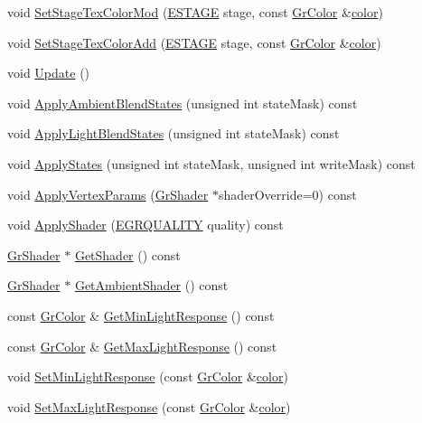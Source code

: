 \begin{CompactItemize}
\item 
void \hyperlink{class_gr_material_pass_92554ebb8bec4354879389bd7d225d10}{SetStageTexColorMod} (\hyperlink{_gr_config_8h_6df36e6af6bdeed00ff250f968160688}{ESTAGE} stage, const \hyperlink{class_gr_color}{GrColor} \&\hyperlink{glext_8h_3ea846f998d64f079b86052b6c4193a8}{color})
\item 
void \hyperlink{class_gr_material_pass_ce347100ba76c2cbaadee8ee02baa4db}{SetStageTexColorAdd} (\hyperlink{_gr_config_8h_6df36e6af6bdeed00ff250f968160688}{ESTAGE} stage, const \hyperlink{class_gr_color}{GrColor} \&\hyperlink{glext_8h_3ea846f998d64f079b86052b6c4193a8}{color})
\item 
void \hyperlink{class_gr_material_pass_461a5f3b7e2ffc51491914ed6bd9654c}{Update} ()
\item 
void \hyperlink{class_gr_material_pass_645501d055a4d4cffb0482a8f91448be}{ApplyAmbientBlendStates} (unsigned int stateMask) const 
\item 
void \hyperlink{class_gr_material_pass_dfdd256fcb0d7bfac731b6db4d9eb575}{ApplyLightBlendStates} (unsigned int stateMask) const 
\item 
void \hyperlink{class_gr_material_pass_272b822ee696efb7e967a9565cd79a97}{ApplyStates} (unsigned int stateMask, unsigned int writeMask) const 
\item 
void \hyperlink{class_gr_material_pass_7ef513dc8a50374348a402c10a3f3cd0}{ApplyVertexParams} (\hyperlink{class_gr_shader}{GrShader} $\ast$shaderOverride=0) const 
\item 
void \hyperlink{class_gr_material_pass_e7fce70c080ca855afb28e2cd0e729bc}{ApplyShader} (\hyperlink{enums_8h_697c1ee1354746841860d5bf9f81c033}{EGRQUALITY} quality) const 
\item 
\hyperlink{class_gr_shader}{GrShader} $\ast$ \hyperlink{class_gr_material_pass_c03a1be09b50c814be01d535c64c4da3}{GetShader} () const 
\item 
\hyperlink{class_gr_shader}{GrShader} $\ast$ \hyperlink{class_gr_material_pass_4581e9b370422f95a8a7e9c8556d0e78}{GetAmbientShader} () const 
\item 
const \hyperlink{class_gr_color}{GrColor} \& \hyperlink{class_gr_material_pass_9609353bb1089baeba6a0a176501cf9f}{GetMinLightResponse} () const 
\item 
const \hyperlink{class_gr_color}{GrColor} \& \hyperlink{class_gr_material_pass_404104b92d23577c62da193eaeacc6cf}{GetMaxLightResponse} () const 
\item 
void \hyperlink{class_gr_material_pass_ddf56d1ef2931a1cded781325ddd8738}{SetMinLightResponse} (const \hyperlink{class_gr_color}{GrColor} \&\hyperlink{glext_8h_3ea846f998d64f079b86052b6c4193a8}{color})
\item 
void \hyperlink{class_gr_material_pass_f66502995683becd9fd606d48da3a384}{SetMaxLightResponse} (const \hyperlink{class_gr_color}{GrColor} \&\hyperlink{glext_8h_3ea846f998d64f079b86052b6c4193a8}{color})
\end{CompactItemize}


